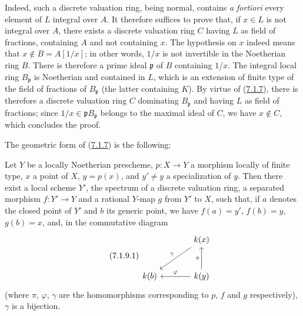 Indeed, such a discrete valuation ring, being normal, contains
\emph{a fortiori} every element of $L$ integral over $A$. It therefore
suffices to prove that, if $x\in L$ is not integral over $A$, there exists a
discrete valuation ring $C$ having $L$ as field of fractions, containing $A$
and not containing $x$. The hypothesis on $x$ indeed means that
$x\notin B=A[1/x]$; in other words, $1/x$ is not invertible in the
Noetherian ring $B$. There is therefore a prime ideal $\mathfrak{p}$ of $B$
containing $1/x$. The integral local ring $B_{\mathfrak{p}}$ is Noetherian and
contained in $L$, which is an extension of finite type of the field of
fractions of $B_{\mathfrak{p}}$ (the latter containing $K$). By virtue of
(\hyperref[II.7.1.7]{7.1.7}), there is therefore a discrete valuation ring
$C$ dominating $B_{\mathfrak{p}}$ and having $L$ as field of fractions;
since $1/x\in\mathfrak{p}B_{\mathfrak{p}}$ belongs to the maximal ideal of
$C$, we have $x\notin C$, which concludes the proof.

The geometric form of (\hyperref[II.7.1.7]{7.1.7}) is the following:

\begin{proposition}[7.1.9]
\label{II.7.1.9}
Let $Y$ be a locally Noetherian prescheme, $p:X\to Y$ a morphism
locally of finite type, $x$ a point of $X$, $y=p(x)$, and $y'\neq y$ a
specialization of $y$. Then there exist a local scheme $Y'$, the spectrum of a
discrete valuation ring, a separated morphism $f:Y'\to Y$ and a
rational $Y$-map $g$ from $Y'$ to $X$, such that, if $a$ denotes the
closed point of $Y'$ and $b$ its generic point, we have $f(a)=y'$,
$f(b)=y$, $g(b)=x$, and, in the commutative diagram
\[
\tag{7.1.9.1}
\label{II.7.1.9.1}
\begin{tikzcd}[column sep=large,row sep=large]
& k(x) \arrow[dl,"\gamma"'] \\
k(b) & k(y) \arrow[u,"\pi"] \arrow[l,"\varphi"']
\end{tikzcd}
\]
(where $\pi$, $\varphi$, $\gamma$ are the homomorphisms corresponding
to $p$, $f$ and $g$ respectively), $\gamma$ is a bijection.
\end{proposition}

